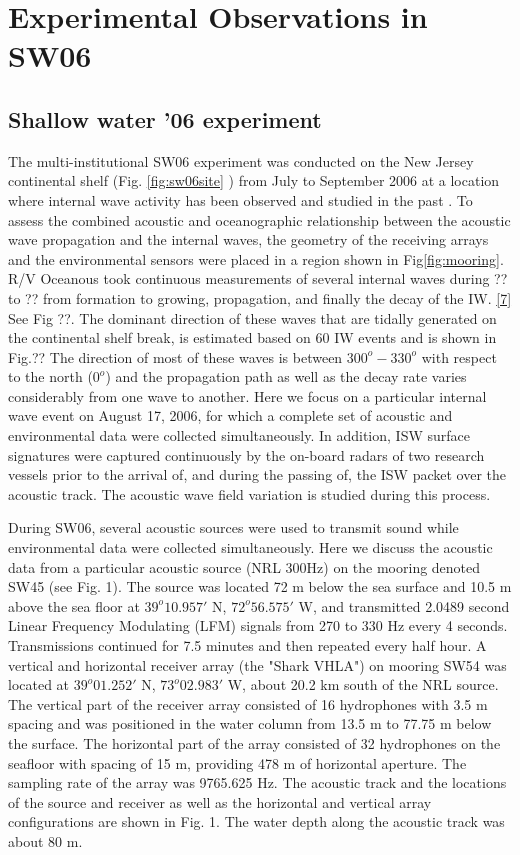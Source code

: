 
\chapter{Experimental Observations in SW06}
\section{Shallow water '06 experiment}
The multi-institutional SW06 experiment was conducted on the New
Jersey continental shelf (Fig. \ref{fig:sw06site} ) from July to
September 2006 at a location where internal wave activity has been
observed and studied in the past\cite{jasa4,Tang1} . To assess the combined acoustic and oceanographic relationship between the acoustic wave propagation and the internal waves, the geometry of the receiving arrays and the environmental sensors were placed in a region shown in Fig\ref{fig:mooring}. R/V Oceanous took continuous measurements of several internal waves during ?? to ?? from formation to growing, propagation, and finally the decay of the IW. \ref{7} See Fig ??. The dominant direction of these waves that are tidally generated on the continental shelf break, is estimated based on 60 IW events and is shown in Fig.?? The direction of most of these waves is between $300^o-330^o$ with respect to the north ($0^o$) and the propagation path as well as the decay rate varies considerably from one wave to another. Here we
focus on a particular internal wave event on August 17, 2006, for
which a complete set of acoustic and environmental data were
collected simultaneously. In addition, ISW surface signatures were
captured continuously by the on-board radars of two research vessels
prior to the arrival of, and during the passing of, the ISW packet
over the acoustic track. The acoustic wave field variation is
studied during this process.


During SW06, several acoustic sources were used to transmit sound while environmental data were collected
simultaneously\cite{WHOI}. Here we discuss the acoustic data from a
particular acoustic source (NRL 300Hz) on the mooring denoted SW45
(see Fig. 1). The source was located 72 m below the sea surface and
10.5 m above the sea floor at $39^{o}10.957'$ N, $72^o56.575'$ W,
and transmitted 2.0489 second Linear Frequency Modulating (LFM)
signals from 270 to 330 Hz every 4 seconds. Transmissions continued
for 7.5 minutes and then repeated every half hour.  A vertical and
horizontal receiver array (the "Shark VHLA") on mooring SW54 was
located at $39^o01.252'$ N, $73^o02.983'$ W, about 20.2 km south of
the NRL source.  The vertical part of the receiver array consisted
of 16 hydrophones with 3.5 m spacing and was positioned in the water
column from 13.5 m to 77.75 m below the surface. The horizontal part
of the array consisted of 32 hydrophones on the seafloor with
spacing of 15 m, providing 478 m of horizontal aperture. The
sampling rate of the array was 9765.625 Hz. The acoustic track and
the locations of the source and receiver as well as the horizontal
and vertical array configurations are shown in Fig. 1. The water
depth along the acoustic track was about 80 m.


